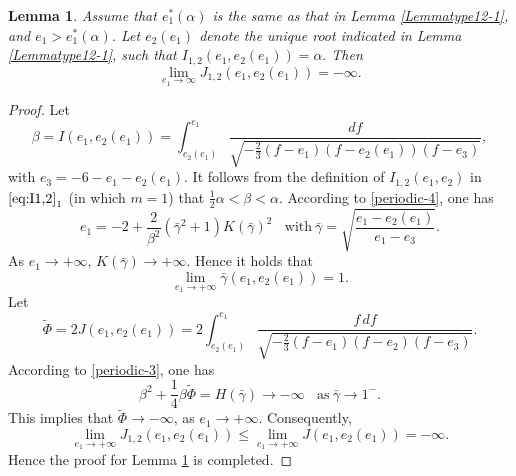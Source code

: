 \documentclass[reqno,12pt]{amsart}
\newtheorem{lemma}[theorem]{Lemma}
\begin{document}
\begin{lemma}\label{Lemmatype12-2}
Assume that $e_1^*(\alpha)$ is the same as that in Lemma \ref{Lemmatype12-1}, and $e_1>e_1^*(\alpha)$.  Let $e_2(e_1)$ denote the unique root indicated in Lemma \ref{Lemmatype12-1}, such that $I_{1,2}(e_1, e_2(e_1)) = \alpha. $ Then 
\begin{equation} \label{type12-5}\nonumber
    \lim_{e_1\rightarrow \infty} J_{1, 2}(e_1, e_2(e_1)) = -\infty. 
\end{equation}
\end{lemma}
\begin{proof}
    Let
    \begin{equation*}
        \beta =I(e_1, e_2(e_1)) = \int_{e_2(e_1)}^{e_1 } \frac{df}{\sqrt{-\frac23 (f - e_1) (f-e_2(e_1)) (f -e_3)}}, 
    \end{equation*}
    with $e_3 = -6 - e_1 - e_2(e_1)$. It follows from the definition of $I_{1,2}(e_1,e_2)$ in ${\eqref{eq:I1,2}}_1$ (in which $m=1$) that $\frac12 \alpha < \beta <\alpha$. 
According to \eqref{periodic-4}, one has  
\begin{equation*}
    e_1  = -2 + \frac{2}{\beta^2}( \bar{\gamma}^2 +1 ) K ( \bar{\gamma})^2 \ \ \ \ \mbox{with}\  \bar{\gamma} = \sqrt{\frac{e_1 - e_2(e_1)}{e_1 - e_3}}. 
\end{equation*}
As $e_1\to +\infty$, $K( \bar{\gamma}) \to+\infty$.
Hence it holds that
\begin{equation*}
    \lim_{e_1 \rightarrow +\infty}  \bar{\gamma}(e_1, e_2(e_1)) = 1. 
\end{equation*}
Let 
\begin{equation*}
    \tilde{\Phi}= 2J(e_1, e_2(e_1)) = 2\int_{e_2(e_1)}^{e_1} \frac{f\, df}{\sqrt{-\frac23(f- e_1)(f-e_2) (f-e_3)}}.
\end{equation*}
According to \eqref{periodic-3}, one has
\begin{equation*}
    \beta^2 + \frac14 \beta  \tilde{\Phi} = H( \bar{\gamma}) \rightarrow -\infty \ \ \ \ \mbox{as}\  \bar{\gamma} \rightarrow 1^-.
\end{equation*} 
This implies that $\tilde{\Phi} \to -\infty$, as $e_1 \to +\infty$. 
Consequently, 
\begin{equation*}
   \lim_{e_1 \rightarrow +\infty} J_{1,2}(e_1, e_2(e_1)) \leq \lim_{e_1 \rightarrow +\infty} J (e_1, e_2(e_1)) = -\infty.
\end{equation*}
Hence the proof for Lemma \ref{Lemmatype12-2} is completed.
\end{proof}
\end{document}
